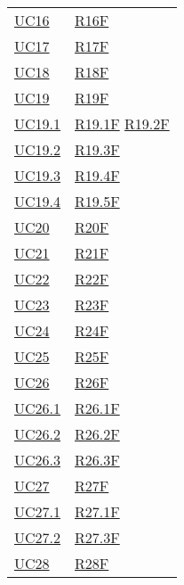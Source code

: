\begin{center}
\begin{longtable}[!h]{m{50px} m{50px}}
        \hyperref[sec:UC16]{UC16}         & \hyperref[tab:RequisitiFunzionali]{R16F}   \\
        \hyperref[sec:UC17]{UC17}         & \hyperref[tab:RequisitiFunzionali]{R17F}   \\
        \hyperref[sec:UC18]{UC18}         & \hyperref[tab:RequisitiFunzionali]{R18F}   \\
        \hyperref[sec:UC19]{UC19}         & \hyperref[tab:RequisitiFunzionali]{R19F}   \\

        \hyperref[sec:UC19.1]{UC19.1}     & \hyperref[tab:RequisitiFunzionali]{R19.1F}
        \newline \hyperref[tab:RequisitiFunzionali]{R19.2F}                            \\

        \hyperref[sec:UC19.2]{UC19.2}     & \hyperref[tab:RequisitiFunzionali]{R19.3F} \\
        \hyperref[sec:UC19.3]{UC19.3}     & \hyperref[tab:RequisitiFunzionali]{R19.4F} \\
        \hyperref[sec:UC19.4]{UC19.4}     & \hyperref[tab:RequisitiFunzionali]{R19.5F} \\
        \hyperref[sec:UC20]{UC20}         & \hyperref[tab:RequisitiFunzionali]{R20F}   \\
        \hyperref[sec:UC21]{UC21}         & \hyperref[tab:RequisitiFunzionali]{R21F}   \\
        \hyperref[sec:UC22]{UC22}         & \hyperref[tab:RequisitiFunzionali]{R22F}   \\
        \hyperref[sec:UC23]{UC23}         & \hyperref[tab:RequisitiFunzionali]{R23F}   \\
        \hyperref[sec:UC24]{UC24}         & \hyperref[tab:RequisitiFunzionali]{R24F}   \\
        \hyperref[sec:UC25]{UC25}         & \hyperref[tab:RequisitiFunzionali]{R25F}   \\
        \hyperref[sec:UC26]{UC26}         & \hyperref[tab:RequisitiFunzionali]{R26F}   \\
        \hyperref[sec:UC26.1]{UC26.1}     & \hyperref[tab:RequisitiFunzionali]{R26.1F} \\
        \hyperref[sec:UC26.2]{UC26.2}     & \hyperref[tab:RequisitiFunzionali]{R26.2F} \\
        \hyperref[sec:UC26.3]{UC26.3}     & \hyperref[tab:RequisitiFunzionali]{R26.3F} \\
        \hyperref[sec:UC27]{UC27}         & \hyperref[tab:RequisitiFunzionali]{R27F}   \\
        \hyperref[sec:UC27.1]{UC27.1}     & \hyperref[tab:RequisitiFunzionali]{R27.1F} \\
        \hyperref[sec:UC27.2]{UC27.2}     & \hyperref[tab:RequisitiFunzionali]{R27.3F} \\
        \hyperref[sec:UC28]{UC28}         & \hyperref[tab:RequisitiFunzionali]{R28F}   \\


\end{longtable}
\end{center}
